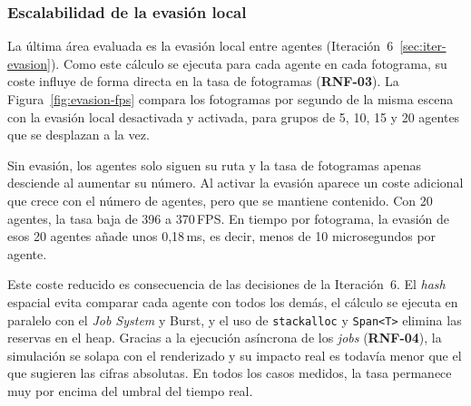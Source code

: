 \subsubsection{Escalabilidad de la evasión local}

La última área evaluada es la evasión local entre agentes (Iteración~6~\ref{sec:iter-evasion}).
Como este cálculo se ejecuta para cada agente en cada fotograma, su coste influye de forma directa en la tasa de fotogramas (\textbf{RNF-03}).
La Figura~\ref{fig:evasion-fps} compara los fotogramas por segundo de la misma escena con la evasión local desactivada y activada, para grupos de 5, 10, 15 y 20 agentes que se desplazan a la vez.

Sin evasión, los agentes solo siguen su ruta y la tasa de fotogramas apenas desciende al aumentar su número.
Al activar la evasión aparece un coste adicional que crece con el número de agentes, pero que se mantiene contenido.
Con 20 agentes, la tasa baja de 396 a 370\,FPS.
En tiempo por fotograma, la evasión de esos 20 agentes añade unos 0,18\,ms, es decir, menos de 10 microsegundos por agente.

Este coste reducido es consecuencia de las decisiones de la Iteración~6.
El \textit{hash} espacial evita comparar cada agente con todos los demás, el cálculo se ejecuta en paralelo con el \textit{Job System} y Burst, y el uso de \texttt{stackalloc} y \texttt{Span\textless T\textgreater} elimina las reservas en el \gls{heap}.
Gracias a la ejecución asíncrona de los \textit{jobs} (\textbf{RNF-04}), la simulación se solapa con el renderizado y su impacto real es todavía menor que el que sugieren las cifras absolutas.
En todos los casos medidos, la tasa permanece muy por encima del umbral del tiempo real.

